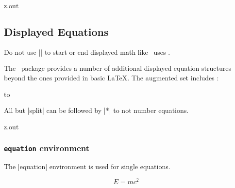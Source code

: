 \begin{VerbatimOut}{z.out}


\subsection{Displayed Equations}

Do not use
|$$|
to start or end displayed math like \TeXLogo\ uses
\cite{gratzer2016}.

The \AMSmathLogo\ package provides a number
of additional displayed equation structures
beyond the ones provided in basic \LaTeX.
The augmented set includes
\cite{amslatex3project2019b}:

\hbox to

All but
|split|
can be followed by
|*|
to not number equations.
\end{VerbatimOut}

\MyIO


\begin{VerbatimOut}{z.out}

\subsubsection{\texttt{equation} environment}

The
|equation|
environment is used for single equations.

\begin{equation}
  E = mc^2
\end{equation}
\end{VerbatimOut}

